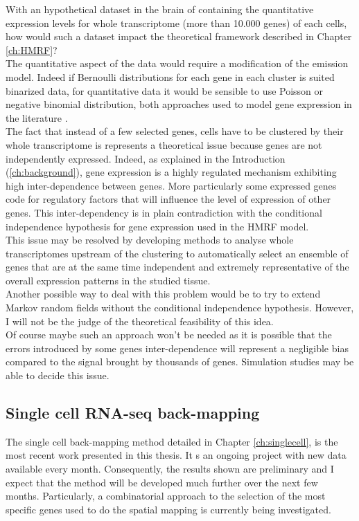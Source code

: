   With an hypothetical dataset in the brain of \platy{} containing the quantitative expression levels for whole transcriptome (more than 10.000 genes) of each cells, how would such a dataset impact the theoretical framework described in Chapter \ref{ch:HMRF}?\\
  
  The quantitative aspect of the data would require a modification of the emission model. Indeed if Bernoulli distributions for each gene in each cluster is suited binarized data, for quantitative data it would be sensible to use Poisson or negative binomial distribution, both approaches used to model gene expression in the literature .\\
  
  The fact that instead of a few selected genes, cells have to be clustered by their whole transcriptome is represents a theoretical issue because genes are not independently expressed. Indeed, as explained in the Introduction (\ref{ch:background}), gene expression is a highly regulated mechanism exhibiting high inter-dependence between genes. More particularly some expressed genes code for regulatory factors that will influence the level of expression of other genes. This inter-dependency is in plain contradiction with the conditional independence hypothesis for gene expression used in the HMRF model.\\
  
  This issue may be resolved by developing methods to analyse whole transcriptomes upstream of the clustering to automatically select an ensemble of genes that are at the same time independent and extremely representative of the overall expression patterns in the studied tissue.\\
  
  Another possible way to deal with this problem would be to try to extend Markov random fields without the conditional independence hypothesis. However, I will not be the judge of the theoretical feasibility of this idea.\\
  
   Of course maybe such an approach won't be needed as it is possible that the errors introduced by some genes inter-dependence will represent a negligible bias compared to the signal brought by thousands of genes. Simulation studies may be able to decide this issue. 


  \subsection{Single cell RNA-seq back-mapping}
  The single cell back-mapping method detailed in Chapter \ref{ch:singlecell}, is the most recent work presented in this thesis. It s an ongoing project with new data available every month. Consequently, the results shown are preliminary and I expect that the method will be developed much further over the next few months. Particularly, a combinatorial approach to the selection of the most specific genes used to do the spatial mapping is currently being investigated.



	



